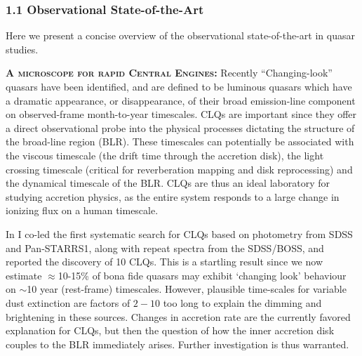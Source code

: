 \subsubsection*{1.1 Observational State-of-the-Art}
Here we present a concise overview of the observational state-of-the-art 
in quasar studies. 

\smallskip
\smallskip
\noindent
\textbf{\textsc{A microscope for rapid Central Engines:}}
Recently ``Changing-look'' quasars \citep[CLQs; ][]{LaMassa2015,
Runnoe2016, Ruan2016, Runco2016, MacLeod2016, Yang2017} have been
identified, and are defined to be luminous quasars which have a
dramatic appearance, or disappearance, of their broad emission-line
component on observed-frame month-to-year timescales.  CLQs are
important since they offer a direct observational probe into the
physical processes dictating the structure of the broad-line region
(BLR). These timescales can potentially be associated with the viscous
timescale (the drift time through the accretion disk), the light
crossing timescale (critical for reverberation mapping and disk
reprocessing) and the dynamical timescale of the BLR.  CLQs are thus
an ideal laboratory for studying accretion physics, as the entire
system responds to a large change in ionizing flux on a human
timescale.

\smallskip \smallskip
\noindent 
In \citet{MacLeod2016} I co-led the first systematic search for CLQs
based on photometry from SDSS and Pan-STARRS1, along with repeat
spectra from the SDSS/BOSS, and reported the discovery of 10
CLQs. This is a startling result since we now estimate
$\approx$10-15\% of bona fide quasars may exhibit `changing look'
behaviour on $\sim$10 year (rest-frame) timescales. However, plausible
time-scales for variable dust extinction are factors of $2-10$ too
long to explain the dimming and brightening in these sources.  Changes
in accretion rate are the currently favored explanation for CLQs, but
then the question of how the inner accretion disk couples to the BLR
immediately arises. Further investigation is thus warranted.

